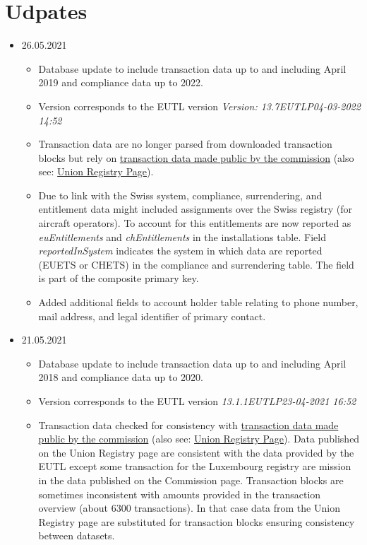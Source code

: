 \documentclass[authoryear]{elsarticle}
\begin{document}
\section*{Udpates}
\begin{itemize}
	\item 26.05.2021
	\begin{itemize}
		\item Database update to include transaction data up to and including April 2019 and compliance data up to 2022. 
		\item Version corresponds to the EUTL version \emph{Version: 13.7EUTLP04-03-2022 14:52}
		\item Transaction data are no longer parsed from downloaded transaction blocks but rely on  \href{https://ec.europa.eu/clima/document/download/0cda99f1-16f6-41e7-b190-887cd71339a4_en?filename=transactions_eutl_2022.zip}{transaction data made public by the commission} (also see: \href{https://ec.europa.eu/clima/eu-action/eu-emissions-trading-system-eu-ets/union-registry_en#tab-0-1}{Union Registry Page}).
		\item Due to link with the Swiss system, compliance, surrendering, and entitlement data might included assignments over the Swiss registry (for aircraft operators). To account for this entitlements are now reported as \emph{euEntitlements} and \emph{chEntitlements} in the installations table. Field \emph{reportedInSystem} indicates the system in which data are reported (EUETS or CHETS) in the compliance and surrendering table. The field is part of the composite primary key. 
		\item Added additional fields to account holder table relating to phone number, mail address, and legal identifier of primary contact.
	\end{itemize}	
	\item 21.05.2021
		\begin{itemize}
			\item Database update to include transaction data up to and including April 2018 and compliance data up to 2020. 
			\item Version corresponds to the EUTL version \emph{13.1.1EUTLP23-04-2021 16:52}
			\item Transaction data checked for consistency with \href{https://ec.europa.eu/clima/sites/default/files/ets/registry/docs/transactions_eutl_2021.zip}{transaction data made public by the commission} (also see: \href{https://ec.europa.eu/clima/policies/ets/registry_en#tab-0-1}{Union Registry Page}). Data published on the Union Registry page are consistent with the data provided by the EUTL except some transaction for the Luxembourg registry are mission in the data published on the Commission page. Transaction blocks are sometimes inconsistent with amounts provided in the transaction overview (about 6300 transactions). In that case data from the Union Registry page are substituted for transaction blocks ensuring consistency between datasets.  			
		\end{itemize}
\end{itemize}
\end{document}
